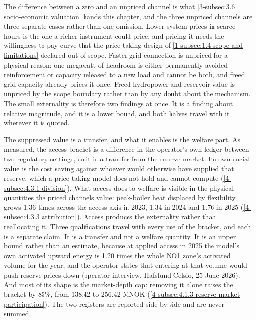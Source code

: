 The difference between a zero and an unpriced channel is what \autoref{3-subsec:3.6 socio-economic valuation} hands this chapter, and the three unpriced channels are three separate cases rather than one omission. Lower system prices in scarce hours is the one a richer instrument could price, and pricing it needs the willingness-to-pay curve that the price-taking design of \autoref{1-subsec:1.4 scope and limitations} declared out of scope. Faster grid connection is unpriced for a physical reason: one megawatt of headroom is either permanently avoided reinforcement or capacity released to a new load and cannot be both, and freed grid capacity already prices it once. Freed hydropower and reservoir value is unpriced by the scope boundary rather than by any doubt about the mechanism. The small externality is therefore two findings at once. It is a finding about relative magnitude, and it is a lower bound, and both halves travel with it wherever it is quoted.

The suppressed value is a transfer, and what it enables is the welfare part. As measured, the access bracket is a difference in the operator's own ledger between two regulatory settings, so it is a transfer from the reserve market. Its own social value is the cost saving against whoever would otherwise have supplied that reserve, which a price-taking model does not hold and cannot compute (\autoref{4-subsec:4.3.1 division}). What access does to welfare is visible in the physical quantities the priced channels value: peak-boiler heat displaced by flexibility grows 1.36 times across the access axis in 2023, 1.34 in 2024 and 1.76 in 2025 (\autoref{4-subsec:4.3.3 attribution}). Access produces the externality rather than reallocating it. Three qualifications travel with every use of the bracket, and each is a separate claim. It is a transfer and not a welfare quantity. It is an upper bound rather than an estimate, because at applied access in 2025 the model's own activated upward energy is 1.20 times the whole NO1 zone's activated volume for the year, and the operator states that entering at that volume would push reserve prices down (operator interview, Hafslund Celsio, 25 June 2026). And most of its shape is the market-depth cap: removing it alone raises the bracket by $85\%$, from 138.42 to 256.42 MNOK (\autoref{4-subsec:4.1.3 reserve market participation}). The two registers are reported side by side and are never summed.

